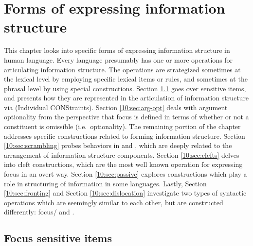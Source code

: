 \chapter{Forms of expressing information structure}
\label{chapter10-3}
\setcounter{enums}{0}

This chapter looks into specific forms of expressing information
structure in human language. Every language presumably has one or more
operations for articulating information structure. The operations are
strategized sometimes at the lexical level by employing specific
lexical items or rules, and sometimes at the phrasal level by using
special constructions.  Section \ref{10:ssec:focus-sensitive} goes over
 sensitive items, and presents how they are represented in
the articulation of information structure via  (Individual
CONStraints).
Section \ref{10:sec:arg-opt} deals with argument optionality from the
perspective that focus is defined in terms of whether or not a
constituent is omissible (i.e.\ optionality).
The remaining portion of the chapter addresses specific constructions
related to forming information structure.
Section \ref{10:sec:scrambling} probes  behaviors in
 and , which are deeply related to the
arrangement of information structure components. Section \ref{10:sec:clefts}
delves into cleft constructions, which are the most well
known operation for expressing focus in an overt way.
Section \ref{10:sec:passive} explores  constructions which play a
role in structuring of information in some languages.  Lastly,
Section \ref{10:sec:fronting} and Section \ref{10:sec:dislocation} investigate two
types of syntactic operations which are seemingly similar to each
other, but are constructed differently: focus/
 and .



\section{Focus sensitive items}
\label{10:ssec:focus-sensitive}


